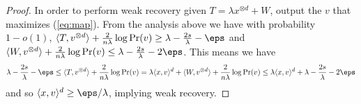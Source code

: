 \documentclass{article}
\begin{document}
\begin{proof}
In order to perform weak recovery given $T = \lambda x^{\otimes d} + W$, output the $v$ that maximizes (\ref{eq:map}). From the analysis above we have with probability $1-o(1)$, $\langle T,v^{\otimes d} \rangle + \frac{2}{n\lambda} \log \Pr(v) \ge \lambda - \frac{2s}{\lambda}- \eps$ and $\langle W,v^{\otimes d} \rangle + \frac{2}{n\lambda} \log \Pr(v) \le \lambda - \frac{2s}{\lambda} - 2\eps$. This means we have
$$\lambda - \frac{2s}{\lambda} - \eps \le \langle T, v^{\otimes d}\rangle + \frac{2}{n\lambda}\log \Pr(v) = \lambda \langle x,v \rangle^d + \langle W,v^{\otimes d} \rangle + \frac{2}{n\lambda}\log \Pr(v) \le \lambda \langle x,v \rangle^d + \lambda - \frac{2s}{\lambda} - 2\eps$$
and so $\langle x,v \rangle^d \ge \eps/\lambda$, implying weak recovery.
\end{proof}
\end{document}
